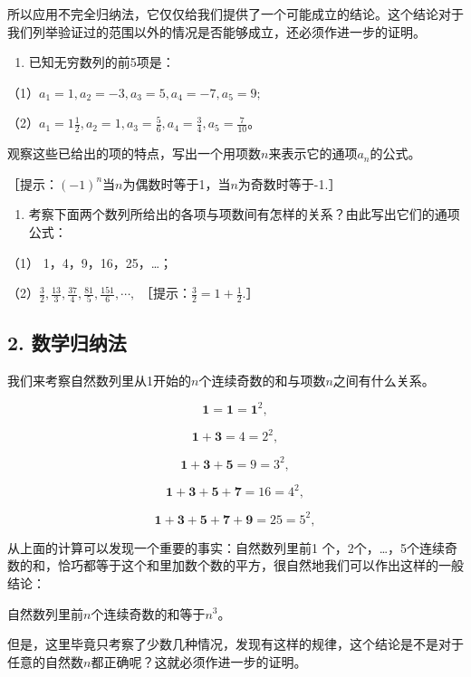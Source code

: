 所以应用不完全归纳法，它仅仅给我们提供了一个可能成立的结论。这个结论对于我们列举验证过的范围以外的情况是否能够成立，还必须作进一步的证明。

\begin{enumerate}
\item
  已知无穷数列的前5项是：
\end{enumerate}

（1）\(a_{1} = 1, a_{2} = -3, a_{3} = 5, a_{4} = -7, a_{5} = 9;\)

（2）\(a_{1} = 1\frac{1}{2}, a_{2} = 1, a_{3} = \frac{5}{6}, a_{4} = \frac{3}{4}, a_{5} = \frac{7}{10}\)。

观察这些已给出的项的特点，写出一个用项数\(n\)来表示它的通项\(a_{n}\)的公式。

［提示：\((-1)^{n}\)当\(n\)为偶数时等于1，当\(n\)为奇数时等于-1.］

\begin{enumerate}[start=2]
\item
  考察下面两个数列所给出的各项与项数间有怎样的关系？由此写出它们的通项公式：
\end{enumerate}

（1） 1，4，9，16，25，\ldots；

（2）\(\frac{3}{2}, \frac{13}{3}, \frac{37}{4}, \frac{81}{5}, \frac{151}{6}, \cdots,\)
［提示：\(\frac{3}{2} = 1 + \frac{1}{2}\).］

\subsection{2. 数学归纳法}

我们来考察自然数列里从1开始的\(n\)个连续奇数的和与项数\(n\)之间有什么关系。

\[
\mathbf {1} = \mathbf {1} = \mathbf {1}^{2},
\]

\[
\mathbf {1} + \mathbf {3} = 4 = 2^{2},
\]

\[
\mathbf {1} + \mathbf {3} + \mathbf {5} = 9 = 3^{2},
\]

\[
\mathbf {1} + \mathbf {3} + \mathbf {5} + \mathbf {7} = 16 = 4^{2},
\]

\[
\mathbf {1} + \mathbf {3} + \mathbf {5} + \mathbf {7} + \mathbf {9} = 25 = 5^{2},
\]

从上面的计算可以发现一个重要的事实：自然数列里前1
个，2个，\ldots，5个连续奇数的和，恰巧都等于这个和里加数个数的平方，很自然地我们可以作出这样的一般结论：

自然数列里前\(n\)个连续奇数的和等于\(n^3\)。

但是，这里毕竟只考察了少数几种情况，发现有这样的规律，这个结论是不是对于任意的自然数\(n\)都正确呢？这就必须作进一步的证明。

